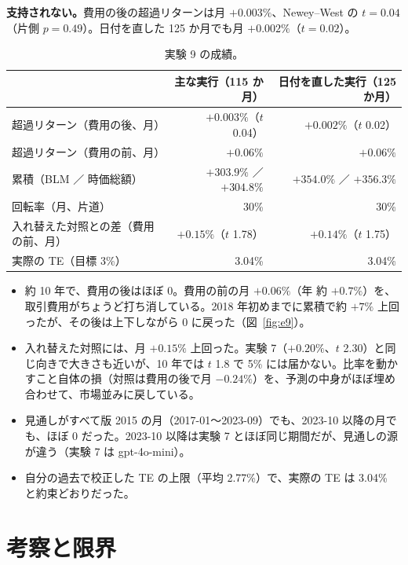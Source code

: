 \documentclass[xelatex,ja=standard,jafont=haranoaji,a4paper,10pt,openany]{bxjsreport}
\newcommand{\figref}[1]{図~\ref{#1}}
\begin{document}
\begin{verdict}
\textbf{支持されない。}費用の後の超過リターンは月 $+0.003\%$、Newey--West の $t=0.04$（片側 $p=0.49$）。日付を直した 125 か月でも月 $+0.002\%$（$t=0.02$）。
\end{verdict}

\begin{table}[H]
\centering
\caption{実験 9 の成績。}
\small
\begin{tabular}{lrr}
\toprule
& 主な実行（115 か月） & 日付を直した実行（125 か月） \\
\midrule
超過リターン（費用の後、月） & $+0.003\%$（$t$ 0.04） & $+0.002\%$（$t$ 0.02） \\
超過リターン（費用の前、月） & $+0.06\%$ & $+0.06\%$ \\
累積（BLM ／ 時価総額） & $+303.9\%$ ／ $+304.8\%$ & $+354.0\%$ ／ $+356.3\%$ \\
回転率（月、片道） & 30\% & 30\% \\
入れ替えた対照との差（費用の前、月） & $+0.15\%$（$t$ 1.78） & $+0.14\%$（$t$ 1.75） \\
実際の TE（目標 3\%） & 3.04\% & 3.04\% \\
\bottomrule
\end{tabular}
\end{table}

\begin{itemize}
\item 約 10 年で、費用の後はほぼ 0。費用の前の月 $+0.06\%$（年 約 $+0.7\%$）を、取引費用がちょうど打ち消している。2018 年初めまでに累積で約 $+7\%$ 上回ったが、その後は上下しながら 0 に戻った（\figref{fig:e9}）。
\item 入れ替えた対照には、月 $+0.15\%$ 上回った。実験 7（$+0.20\%$、$t$ 2.30）と同じ向きで大きさも近いが、10 年では $t$ 1.8 で 5\% には届かない。比率を動かすこと自体の損（対照は費用の後で月 $-0.24\%$）を、予測の中身がほぼ埋め合わせて、市場並みに戻している。
\item 見通しがすべて版 2015 の月（2017-01〜2023-09）でも、2023-10 以降の月でも、ほぼ 0 だった。2023-10 以降は実験 7 とほぼ同じ期間だが、見通しの源が違う（実験 7 は gpt-4o-mini）。
\item 自分の過去で校正した TE の上限（平均 2.77\%）で、実際の TE は 3.04\% と約束どおりだった。
\end{itemize}

\chapter{考察と限界}\label{ch:discussion}
\end{document}
